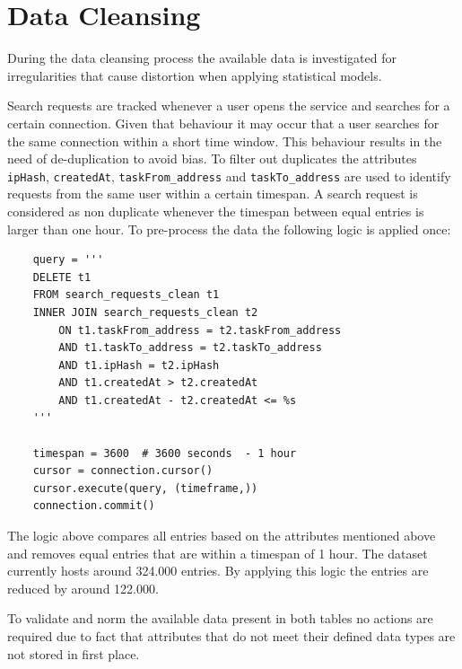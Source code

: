 \section{Data Cleansing}
\label{sec:data_cleansing}
During the data cleansing process the available data is investigated for irregularities that cause distortion when applying statistical models. 

Search requests are tracked whenever a user opens the service and searches for a certain connection. Given that behaviour it may occur that a user searches for the same connection within a short time window. This behaviour results in the need of de-duplication to avoid bias. To filter out duplicates the attributes \verb|ipHash|, \verb|createdAt|, \verb|taskFrom_address| and \verb|taskTo_address| are used to identify requests from the same user within a certain timespan. A search request is considered as non duplicate whenever the timespan between equal entries is larger than one hour. 
To pre-process the data the following logic is applied once:
\begin{lstlisting}
    query = '''
    DELETE t1
    FROM search_requests_clean t1
    INNER JOIN search_requests_clean t2
        ON t1.taskFrom_address = t2.taskFrom_address
        AND t1.taskTo_address = t2.taskTo_address
        AND t1.ipHash = t2.ipHash
        AND t1.createdAt > t2.createdAt
        AND t1.createdAt - t2.createdAt <= %s
	'''

    timespan = 3600  # 3600 seconds  - 1 hour
    cursor = connection.cursor()
    cursor.execute(query, (timeframe,))
    connection.commit()
\end{lstlisting}
The logic above compares all entries based on the attributes mentioned above and removes equal entries that are within a timespan of 1 hour. The dataset currently hosts around 324.000 entries. By applying this logic the entries are reduced by around 122.000. 

To validate and norm the available data present in both tables no actions are required due to fact that attributes that do not meet their defined data types are not stored in first place. 
